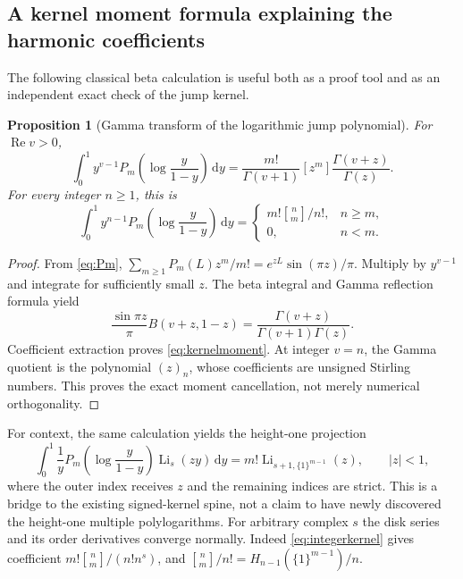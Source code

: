 \documentclass[11pt]{article}
\numberwithin{equation}{section}
\newtheorem{proposition}[theorem]{Proposition}
\theoremstyle{definition}\newtheorem{definition}[theorem]{Definition}
\theoremstyle{remark}\newtheorem{remark}[theorem]{Remark}
\newcommand{\Li}{\operatorname{Li}}
\newcommand{\dd}{\,\mathrm d}
\newcommand{\Rea}{\operatorname{Re}}
\newcommand{\stirling}[2]{\genfrac{[}{]}{0pt}{}{#1}{#2}}
\begin{document}
\subsection{A kernel moment formula explaining the harmonic coefficients}
The following classical beta calculation is useful both as a proof tool and as an independent exact check of the jump kernel.
\begin{proposition}[Gamma transform of the logarithmic jump polynomial]\label{prop:kernelmoment}
For $\Rea v>0$,
\begin{equation}\label{eq:kernelmoment}
 \int_0^1 y^{v-1}P_m\left(\log\frac y{1-y}\right)\dd y
 =\frac{m!}{\Gamma(v+1)}[z^m]\frac{\Gamma(v+z)}{\Gamma(z)}.
\end{equation}
For every integer $n\ge1$, this is
\begin{equation}\label{eq:integerkernel}
 \int_0^1 y^{n-1}P_m\left(\log\frac y{1-y}\right)\dd y
 =\begin{cases}m!\stirling n m/n!,&n\ge m,\\0,&n<m.\end{cases}
\end{equation}
\end{proposition}
\begin{proof}
From \eqref{eq:Pm},
$\sum_{m\ge1}P_m(L)z^m/m!=e^{zL}\sin(\pi z)/\pi$.
Multiply by $y^{v-1}$ and integrate for sufficiently small $z$. The beta integral and Gamma reflection formula yield
\[
 \frac{\sin\pi z}{\pi}B(v+z,1-z)
 =\frac{\Gamma(v+z)}{\Gamma(v+1)\Gamma(z)}.
\]
Coefficient extraction proves \eqref{eq:kernelmoment}. At integer $v=n$, the Gamma quotient is the polynomial $(z)_n$, whose coefficients are unsigned Stirling numbers. This proves the exact moment cancellation, not merely numerical orthogonality.
\end{proof}

For context, the same calculation yields the height-one projection
\begin{equation}\label{eq:heightone}
 \int_0^1\frac1y P_m\left(\log\frac y{1-y}\right)\Li_s(zy)\dd y
 =m!\Li_{s+1,\{1\}^{m-1}}(z),\qquad |z|<1,
\end{equation}
where the outer index receives $z$ and the remaining indices are strict. This is a bridge to the existing signed-kernel spine, not a claim to have newly discovered the height-one multiple polylogarithms. For arbitrary complex $s$ the disk series and its order derivatives converge normally. Indeed \eqref{eq:integerkernel} gives coefficient $m!\stirling n m/(n!n^s)$, and
$\stirling n m/n!=H_{n-1}(\{1\}^{m-1})/n$.
\end{document}
